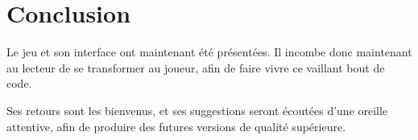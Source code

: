 \section{Conclusion}
\label{section:conclusion}
	Le jeu et son interface ont maintenant été présentées. Il incombe donc maintenant au lecteur de se transformer au joueur, afin de faire vivre ce vaillant bout de code.

	Ses retours sont les bienvenus, et ses suggestions seront écoutées d'une oreille attentive, afin de produire des futures versions de qualité supérieure.